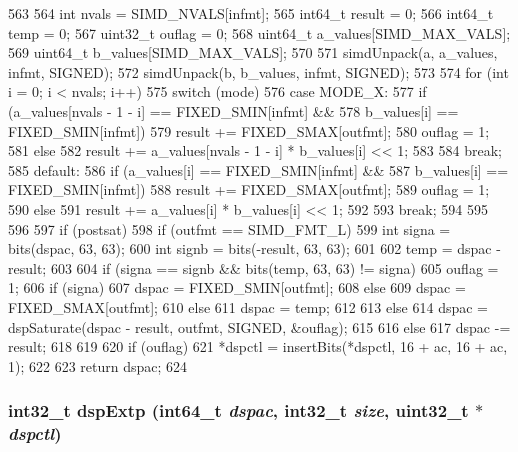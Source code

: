 \begin{DoxyCode}
563 {
564     int nvals = SIMD_NVALS[infmt];
565     int64_t result = 0;
566     int64_t temp = 0;
567     uint32_t ouflag = 0;
568     uint64_t a_values[SIMD_MAX_VALS];
569     uint64_t b_values[SIMD_MAX_VALS];
570 
571     simdUnpack(a, a_values, infmt, SIGNED);
572     simdUnpack(b, b_values, infmt, SIGNED);
573 
574     for (int i = 0; i < nvals; i++) {
575         switch (mode) {
576           case MODE_X:
577             if (a_values[nvals - 1 - i] == FIXED_SMIN[infmt] &&
578                 b_values[i] == FIXED_SMIN[infmt]) {
579                 result += FIXED_SMAX[outfmt];
580                 ouflag = 1;
581             } else {
582                 result += a_values[nvals - 1 - i] * b_values[i] << 1;
583             }
584             break;
585           default:
586             if (a_values[i] == FIXED_SMIN[infmt] &&
587                 b_values[i] == FIXED_SMIN[infmt]) {
588                 result += FIXED_SMAX[outfmt];
589                 ouflag = 1;
590             } else {
591                 result += a_values[i] * b_values[i] << 1;
592             }
593             break;
594         }
595     }
596 
597     if (postsat) {
598         if (outfmt == SIMD_FMT_L) {
599             int signa = bits(dspac, 63, 63);
600             int signb = bits(-result, 63, 63);
601 
602             temp = dspac - result;
603 
604             if (signa == signb && bits(temp, 63, 63) != signa) {
605                 ouflag = 1;
606                 if (signa)
607                     dspac = FIXED_SMIN[outfmt];
608                 else
609                     dspac = FIXED_SMAX[outfmt];
610             } else {
611                 dspac = temp;
612             }
613         } else {
614             dspac = dspSaturate(dspac - result, outfmt, SIGNED, &ouflag);
615         }
616     } else {
617         dspac -= result;
618     }
619 
620     if (ouflag)
621         *dspctl = insertBits(*dspctl, 16 + ac, 16 + ac, 1);
622 
623     return dspac;
624 }
\end{DoxyCode}
\hypertarget{namespaceMipsISA_ad04813c746ce8f173114b51ca2ee74fb}{
\subsubsection[{dspExtp}]{\setlength{\rightskip}{0pt plus 5cm}int32\_\-t dspExtp (int64\_\-t {\em dspac}, \/  int32\_\-t {\em size}, \/  {\bf uint32\_\-t} $\ast$ {\em dspctl})}}
\label{namespaceMipsISA_ad04813c746ce8f173114b51ca2ee74fb}



